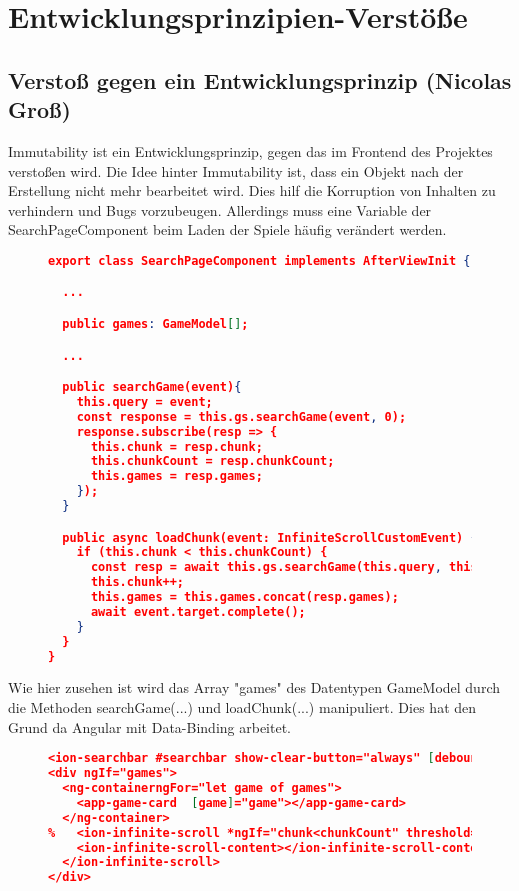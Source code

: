 
\section{Entwicklungsprinzipien-Verstöße}

\subsection*{Verstoß gegen ein Entwicklungsprinzip (Nicolas Groß)}

Immutability ist ein Entwicklungsprinzip, gegen das im Frontend des Projektes verstoßen wird. Die Idee hinter Immutability ist, dass ein Objekt nach der Erstellung nicht mehr bearbeitet wird. Dies hilf die Korruption von Inhalten zu verhindern und Bugs vorzubeugen.
Allerdings muss eine Variable der SearchPageComponent beim Laden der Spiele häufig verändert werden. 
\begin{figure}[bht]
\begin{lstlisting}[caption=Codeausschnitt der SearchPageComponent,language=json]
export class SearchPageComponent implements AfterViewInit {

  ...

  public games: GameModel[];

  ...

  public searchGame(event){
    this.query = event;
    const response = this.gs.searchGame(event, 0);
    response.subscribe(resp => {
      this.chunk = resp.chunk;
      this.chunkCount = resp.chunkCount;
      this.games = resp.games;
    });
  }

  public async loadChunk(event: InfiniteScrollCustomEvent) {
    if (this.chunk < this.chunkCount) {
      const resp = await this.gs.searchGame(this.query, this.chunk +1).toPromise();
      this.chunk++;
      this.games = this.games.concat(resp.games);
      await event.target.complete();
    }
  }
}
\end{lstlisting}
\end{figure}

Wie hier zusehen ist wird das Array "games" des Datentypen GameModel durch die Methoden searchGame(...) und loadChunk(...) manipuliert.
Dies hat den Grund da Angular mit Data-Binding arbeitet.

\begin{figure}[bht]
\begin{lstlisting}[caption=Codeausschnitt der SearchBar,language=json]
<ion-searchbar #searchbar show-clear-button="always" [debounce]="500" (ionChange)="this.searchGame(\$event)"></ion-searchbar>
<div ngIf="games">
  <ng-containerngFor="let game of games">
    <app-game-card  [game]="game"></app-game-card>
  </ng-container>
%   <ion-infinite-scroll *ngIf="chunk<chunkCount" threshold="1000px" (ionInfinite)="loadChunk($event)">
    <ion-infinite-scroll-content></ion-infinite-scroll-content>
  </ion-infinite-scroll>
</div>
\end{lstlisting}
\end{figure}

